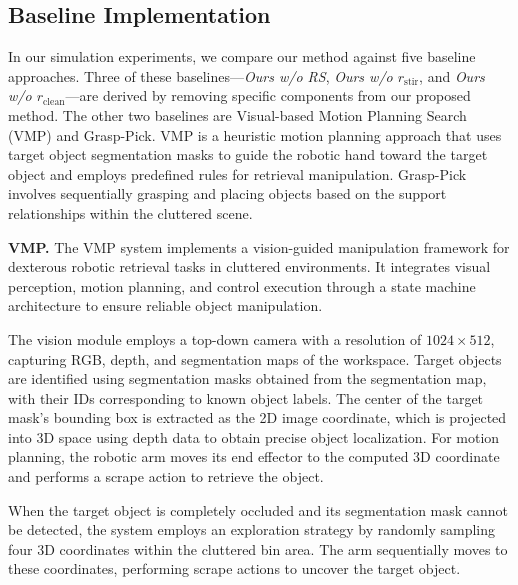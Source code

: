 \subsection{Baseline Implementation}\label{appendix:baseline}
In our simulation experiments, we compare our method against five baseline approaches. Three of these baselines—\textit{Ours w/o RS}, \textit{Ours w/o $r_\textrm{stir}$}, and \textit{Ours w/o $r_\textrm{clean}$}—are derived by removing specific components from our proposed method. The other two baselines are Visual-based Motion Planning Search (VMP) and Grasp-Pick. VMP is a heuristic motion planning approach that uses target object segmentation masks to guide the robotic hand toward the target object and employs predefined rules for retrieval manipulation. Grasp-Pick involves sequentially grasping and placing objects based on the support relationships within the cluttered scene.

\noindent \textbf{VMP.} The VMP system implements a vision-guided manipulation framework for dexterous robotic retrieval tasks in cluttered environments. It integrates visual perception, motion planning, and control execution through a state machine architecture to ensure reliable object manipulation.

The vision module employs a top-down camera with a resolution of $1024 \times 512$, capturing RGB, depth, and segmentation maps of the workspace. Target objects are identified using segmentation masks obtained from the segmentation map, with their IDs corresponding to known object labels. The center of the target mask’s bounding box is extracted as the 2D image coordinate, which is projected into 3D space using depth data to obtain precise object localization. For motion planning, the robotic arm moves its end effector to the computed 3D coordinate and performs a scrape action to retrieve the object. 

When the target object is completely occluded and its segmentation mask cannot be detected, the system employs an exploration strategy by randomly sampling four 3D coordinates within the cluttered bin area. The arm sequentially moves to these coordinates, performing scrape actions to uncover the target object. 

